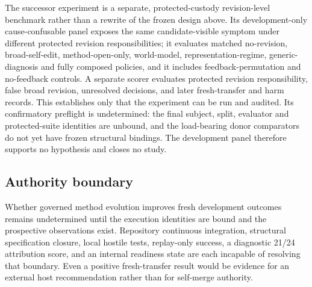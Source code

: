 The successor experiment is a separate, protected-custody revision-level benchmark rather than a rewrite of the frozen design above. Its development-only cause-confusable panel exposes the same candidate-visible symptom under different protected revision responsibilities; it evaluates matched no-revision, broad-self-edit, method-open-only, world-model, representation-regime, generic-diagnosis and fully composed policies, and it includes feedback-permutation and no-feedback controls. A separate scorer evaluates protected revision responsibility, false broad revision, unresolved decisions, and later fresh-transfer and harm records. This establishes only that the experiment can be run and audited. Its confirmatory preflight is undetermined: the final subject, split, evaluator and protected-suite identities are unbound, and the load-bearing donor comparators do not yet have frozen structural bindings. The development panel therefore supports no hypothesis and closes no study.

\subsection{Authority boundary}

Whether governed method evolution improves fresh development outcomes remains undetermined until the execution identities are bound and the prospective observations exist. Repository continuous integration, structural specification closure, local hostile tests, replay-only success, a diagnostic 21/24 attribution score, and an internal readiness state are each incapable of resolving that boundary. Even a positive fresh-transfer result would be evidence for an external host recommendation rather than for self-merge authority.
